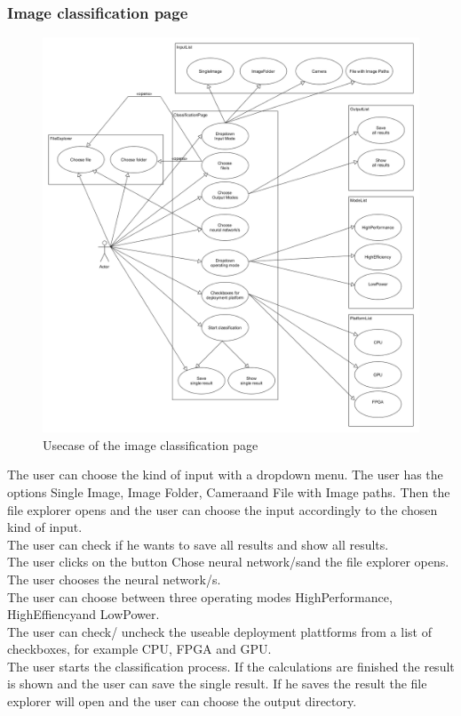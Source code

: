 \documentclass[parskip=full]{scrartcl}
\begin{document}
\subsubsection{Image classification page}
\begin{figure}[htb!]
\centering
\includegraphics[width=\textwidth]{ClassificationUsecase}
\caption{Usecase of the \gls{image classification} page}
\end{figure}
The user can choose the kind of input with a dropdown menu. The user has the options \grqq Single Image\grqq, \grqq Image Folder\grqq, \grqq Camera\grqq and \grqq File with Image paths\grqq. Then the file explorer opens and the user can choose the input accordingly to the chosen kind of input.\\
The user can check if he wants to save all results and show all results.\\
The user clicks on the button \grqq Chose neural network/s\grqq and the file explorer opens. The user chooses the neural network/s.\\
The user can choose between three operating modes \grqq HighPerformance\grqq, \grqq HighEffiency\grqq and \grqq LowPower\grqq.\\
The user can check/ uncheck the useable deployment plattforms from a list of checkboxes, for example CPU, FPGA and GPU. \\
The user starts the classification process. If the calculations are finished the result is shown and the user can save the single result. If he saves the result the file explorer will open and the user can choose the output directory. 
\end{document}
